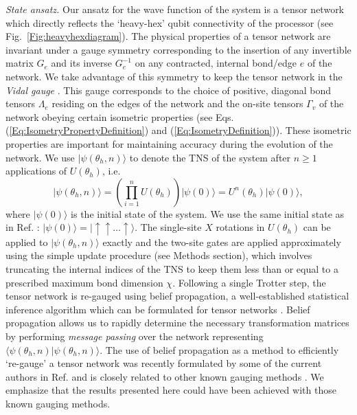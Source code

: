 \documentclass[%
 superscriptaddress,
 amsmath,amssymb,
 prx,
]{revtex4-2}
\newcommand{\mf}[1]{{\color{blue}{[MF: #1]}}}
\begin{document}
\par \emph{State ansatz.} Our ansatz for the wave function of the system is a tensor network which directly reflects the `heavy-hex' qubit connectivity of the processor (see Fig.~\ref{Fig:heavyhexdiagram}). The physical properties of a tensor network are invariant under a gauge symmetry corresponding to the insertion of any invertible matrix $G_{e}$ and its inverse $G_{e}^{-1}$ on any contracted, internal bond/edge $e$ of the network.
We take advantage of this symmetry to keep the tensor network in the \emph{Vidal gauge} \cite{Vidal2003, Jiang2008}. This gauge corresponds to the choice of positive, diagonal bond tensors $\Lambda_{e}$ residing on the edges of the network and the on-site tensors $\Gamma_{v}$ of the network obeying certain isometric properties (see Eqs. (\ref{Eq:IsometryPropertyDefinition}) and (\ref{Eq:IsometryDefinition})). These isometric properties are important for maintaining accuracy during the evolution of the network. We use $\vert \psi(\theta_{h}, n) \rangle$ to denote the TNS of the system after $n \geq 1$ applications of $U(\theta_{h})$, i.e. 
\begin{equation}
    \vert \psi(\theta_{h}, n) \rangle = \left(\prod_{i=1}^{n}U(\theta_{h})\right)\vert \psi(0) \rangle = U^{n}(\theta_{h})\vert \psi(0) \rangle,
    \label{Eq:State}
\end{equation}
where $\vert \psi(0) \rangle$ is the initial state of the system. We use the same initial state as in Ref. \cite{kim2023}: $\vert \psi(0) \rangle = \vert\! \uparrow \uparrow \hdots \uparrow \rangle$.
The single-site $X$ rotations in $U(\theta_{h})$ can be applied to $\vert \psi(\theta_{h}, n) \rangle$ exactly and the two-site gates are applied approximately using the simple update \cite{Jiang2008} procedure (see Methods section), which involves truncating the internal indices of the TNS to keep them less than or equal to a prescribed maximum bond dimension $\chi$. Following a single Trotter step, the tensor network is re-gauged using belief propagation, a well-established statistical inference algorithm which can  be formulated for tensor networks \cite{TensorNetworkBeliefPropagation2}. Belief propagation allows us to rapidly determine the necessary transformation matrices by performing \emph{message passing} over the network representing $\langle \psi(\theta_{h}, n) \vert \psi(\theta_{h}, n) \rangle$. The use of belief propagation as a method to efficiently `re-gauge' a tensor network was recently formulated by some of the current authors in Ref. \cite{TindallGauging2023} \mf{Update reference for new arXiv posting https://arxiv.org/abs/2306.17837.} and is closely related to other known gauging methods  \cite{Ran2012,Phien2015,Jahromi2019,SimpleUpdateGauging3}. We emphasize that the results presented here could have been achieved with those known gauging methods.
\end{document}
